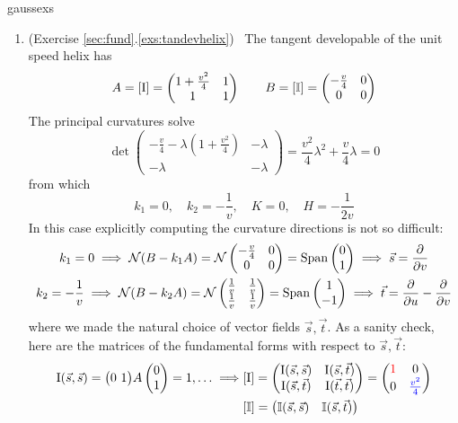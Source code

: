 \begin{examples}{}{gaussexs}
\begin{enumerate}
	\item\label{ex:tandevgauss} (Exercise \ref*{sec:fund}.\ref{exs:tandevhelix}) \ The tangent developable of the unit speed helix has	
  \[
  A=[\mathrm{I}]=\begin{pmatrix}
  1+\tfrac{v^2}{4}&1\\
  1&1
  \end{pmatrix}\qquad
  B=[\mathbb{I}]=\begin{pmatrix}
  -\tfrac{v}{4}&0\\
  0&0
  \end{pmatrix}\]
  The principal curvatures solve
  \[\det\begin{pmatrix}
  -\frac v4-\lambda\left(1+\frac{v^2}4\right)&-\lambda\\
  -\lambda&-\lambda
  \end{pmatrix}
  =\frac{v^2}4\lambda^2+\frac v4\lambda=0
  \]
  from which 
  \[
  k_1=0,\quad k_2=-\frac 1v,\quad K=0,\quad H=-\frac 1{2v}
  \]
  In this case explicitly computing the curvature directions is not so difficult:
  \begin{gather*}
  k_1=0\implies \mathcal{N}(B-k_1A)=\mathcal{N}\begin{pmatrix}
  -\frac v4&0\\
  0&0
  \end{pmatrix}=\operatorname{Span}\begin{pmatrix}0\\1\end{pmatrix}\implies \vec s=\frac{\partial }{\partial v}\\
  k_2=-\frac 1v\implies \mathcal{N}(B-k_2A)=\mathcal{N}\begin{pmatrix}
	\frac 1v&\frac 1v\\
  \frac 1v&\frac 1v
  \end{pmatrix}=\operatorname{Span}\begin{pmatrix}1\\-1\end{pmatrix} \implies \vec t=\frac{\partial }{\partial u}-\frac{\partial }{\partial v}
  \end{gather*}
  where we made the natural choice of vector fields $\vec s,\vec t$. As a sanity check, here are the matrices of the fundamental forms with respect to $\vec s,\vec t$:
  \begin{align*}
  \mathrm{I}(\vec s,\vec s)=\bigl(0\ 1\bigr)A\begin{pmatrix}0\\1\end{pmatrix}=1,\ldots \implies
  &[\mathrm{I}]=\begin{pmatrix}
  	\mathrm{I}(\vec s,\vec s)&\mathrm{I}(\vec s,\vec t)\\
  	\mathrm{I}(\vec s,\vec t)&\mathrm{I}(\vec t,\vec t)
	\end{pmatrix}
	=
	\begin{pmatrix}
  \textcolor{red}{1}&0\\
  0&\textcolor{blue}{\frac{v^2}4}
  \end{pmatrix}\\
  &
  [\mathbb{I}]=\begin{pmatrix}
  	\mathbb{I}(\vec s,\vec s)&\mathbb{I}(\vec s,\vec t)\\

\end{pmatrix}
\end{align*}
\end{enumerate}
\end{examples}
